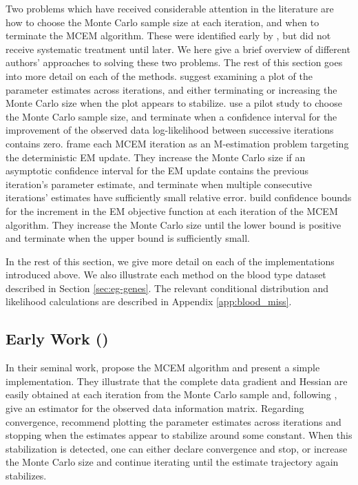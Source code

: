 \documentclass[11pt, oneside]{article}   	%
\begin{document}
Two problems which have received considerable attention in the literature are how to choose the Monte Carlo sample size at each iteration, and when to terminate the MCEM algorithm. These were identified early by \citet{Wei90}, but did not receive systematic treatment until later. We here give a brief overview of different authors' approaches to solving these two problems. The rest of this section goes into more detail on each of the methods. \citet{Wei90} suggest examining a plot of the parameter estimates across iterations, and either terminating or increasing the Monte Carlo size when the plot appears to stabilize. \citet{Cha95} use a pilot study to choose the Monte Carlo sample size, and terminate when a confidence interval for the improvement of the observed data log-likelihood between successive iterations contains zero. \citet{Boo99} frame each MCEM iteration as an M-estimation problem targeting the deterministic EM update. They increase the Monte Carlo size if an asymptotic confidence interval for the EM update contains the previous iteration's parameter estimate, and terminate when multiple consecutive iterations' estimates have sufficiently small relative error. \citet{Caf05} build confidence bounds for the increment in the EM objective function at each iteration of the MCEM algorithm. They increase the Monte Carlo size until the lower bound is positive and terminate when the upper bound is sufficiently small.

In the rest of this section, we give more detail on each of the implementations introduced above. We also illustrate each method on the blood type dataset described in Section \ref{sec:eg-genes}. The relevant conditional distribution and likelihood calculations are described in Appendix \ref{app:blood_miss}.

\subsection{Early Work (\citealp{Wei90})}

In their seminal work, \citet{Wei90} propose the MCEM algorithm and present a simple implementation. They illustrate that the complete data gradient and Hessian are easily obtained at each iteration from the Monte Carlo sample and, following \citet{Lou82}, give an estimator for the observed data information matrix. Regarding convergence, \citeauthor{Wei90} recommend plotting the parameter estimates across iterations and stopping when the estimates appear to stabilize around some constant. When this stabilization is detected, one can either declare convergence and stop, or increase the Monte Carlo size and continue iterating until the estimate trajectory again stabilizes.
\end{document}
